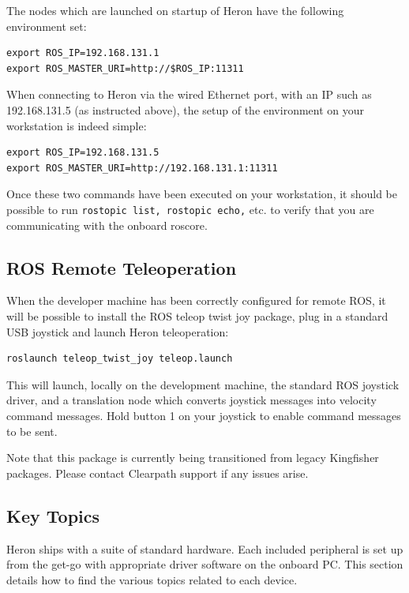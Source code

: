 \documentclass[]{clearpath-latex/clearpath-manual}
\begin{document}
The nodes which are launched on startup of Heron have the following environment set:

\begin{lstlisting}
export ROS_IP=192.168.131.1
export ROS_MASTER_URI=http://$ROS_IP:11311
\end{lstlisting}

When connecting to Heron via the wired Ethernet port, with an IP such as 192.168.131.5 (as instructed above), the setup of the environment on your workstation is indeed simple:

\begin{lstlisting}
export ROS_IP=192.168.131.5
export ROS_MASTER_URI=http://192.168.131.1:11311
\end{lstlisting}

Once these two commands have been executed on your workstation, it should be possible to run \lstinline{rostopic list, rostopic echo,} etc. to verify that you are communicating with the onboard roscore.



\subsection{ROS Remote Teleoperation}

When the developer machine has been correctly configured for remote ROS, it will be possible to install the ROS teleop twist joy package, plug in a standard USB joystick and launch Heron teleoperation:

\begin{lstlisting}
roslaunch teleop_twist_joy teleop.launch
\end{lstlisting}

This will launch, locally on the development machine, the standard ROS joystick driver, and a translation node which converts joystick messages into velocity command messages. Hold button 1 on your joystick to enable command messages to be sent.

Note that this package is currently being transitioned from legacy Kingfisher packages. Please contact Clearpath support if any issues arise.

\pagebreak

\subsection{Key Topics}
Heron ships with a suite of standard hardware. Each included peripheral is set up from the get-go with appropriate driver software on the onboard PC. This section details how to find the various topics related to each device.
\end{document}
